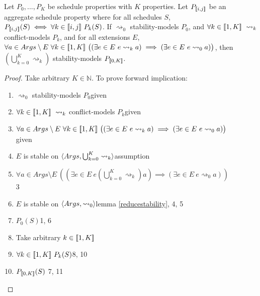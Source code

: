\begin{theorem}
	\label{modelling}
	Let $P_0,...,P_K$ be schedule properties with $K$ properties. Let $P_{[\![{i,j}]\!]}$ be an aggregate schedule property where for all schedules $S$, $P_{[\![{i, j}]\!]}(S)\iff\forall k\in[\![{i,j}]\!]\ P_k(S)$.
	\linespace
	If $\rightsquigarrow_0$ stability-models $P_0$, and $\forall k\in\intset{1,K}\ \rightsquigarrow_k$ conflict-models $P_k$, and for all extensions $E$, $\forall a\in Args\setminus E\ \forall k\in[\![{1,K}]\!]\ \big((\exists e\in E\ e\rightsquigarrow_k a)\implies(\exists e\in E\ e\rightsquigarrow_0 a)\big)$, then $\left(\bigcup_{k=0}^K\rightsquigarrow_k\right)$ stability-models $P_{[\![{0,K}]\!]}$.
	
	\begin{proof}
		Take arbitrary $K\in\mathbb{N}$. To prove forward implication:
		\begin{enumerate}
			\item$\rightsquigarrow_0$ stability-models $P_0$\hfill given
			\item$\forall k\in\intset{1,K}\ \rightsquigarrow_k$ conflict-models $P_k$\hfill given
			\item$\forall a\in Args\setminus E\ \forall k\in[\![{1,K}]\!]\ \big((\exists e\in E\ e\rightsquigarrow_k a)\implies(\exists e\in E\ e\rightsquigarrow_0 a)\big)$\\\null\hfill given
			\item$E$ is stable on $\langle{Args},{\bigcup_{k=0}^K\rightsquigarrow_k}\rangle$\hfill assumption
			\item$\forall a\in Args\setminus E\ \left(\left(\exists e\in E\ e\left(\bigcup_{k=0}^K\rightsquigarrow_k\right) a\right)\implies(\exists e\in E\ e\rightsquigarrow_0 a)\right)$\\\null\hfill 3
			\item$E$ is stable on $\langle{Args},{\rightsquigarrow_0}\rangle$\hfill lemma \ref{reducestability}, 4, 5
			\item$P_0(S)$\hfill 1, 6
			\item Take arbitrary $k\in[\![{1,K}]\!]$
			\item$\forall k\in\intset{1,K}\ P_k(S)$\hfill 8, 10
			\item$P_{[\![{0,K}]\!]}(S)$ \hfill 7, 11
		\end{enumerate}
	

\end{proof}
\end{theorem}
